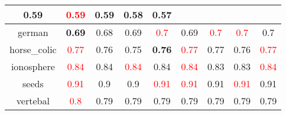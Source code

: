 \documentclass{article}%
\begin{document}
\begin{tabular}{c|cccccccc}
{0.59
}&\textcolor{red}{ 
0.59
}&0.59&\textbf{0.58}&0.57\\%
\hline%
german&\textbf{0.69}&0.68&0.69&\textcolor{red}{ 
0.7
}&0.69&\textcolor{red}{ 
0.7
}&\textcolor{red}{ 
0.7
}&0.7\\%
\hline%
horse\_colic&\textcolor{red}{ 
0.77
}&0.76&0.75&\textbf{0.76}&\textcolor{red}{ 
0.77
}&0.77&0.76&\textcolor{red}{ 
0.77
}\\%
\hline%
ionosphere&\textcolor{red}{ 
0.84
}&0.84&\textcolor{red}{ 
0.84
}&0.84&\textcolor{red}{ 
0.84
}&0.83&0.83&\textcolor{red}{ 
0.84
}\\%
\hline%
seeds&\textcolor{red}{ 
0.91
}&0.9&0.9&\textcolor{red}{ 
0.91
}&\textcolor{red}{ 
0.91
}&0.91&\textcolor{red}{ 
0.91
}&0.91\\%
\hline%
vertebal&\textcolor{red}{ 
0.8
}&0.79&0.79&0.79&0.79&0.79&0.79&0.79\\%
\hline%
\end{tabular}

%
\end{document}
